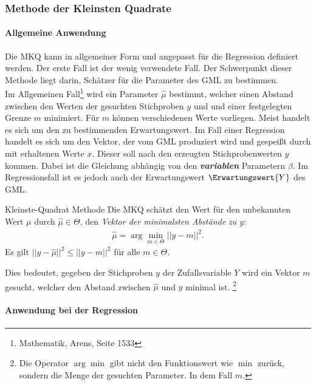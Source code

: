 \subsubsection{Methode der Kleinsten Quadrate}
\paragraph{Allgemeine Anwendung}
Die \gls{MKQ} kann in allgemeiner Form und angepasst für die Regression definiert werden. Der erste Fall ist der wenig verwendete Fall. Der Schwerpunkt dieser Methode liegt darin, Schätzer für die Parameter des \gls{GML} zu bestimmen.\\

Im Allgemeinen Fall\footnote{Mathematik, Arens, Seite 1533} wird ein Parameter $\hat{\mu}$ bestimmt, welcher einen Abstand zwischen den Werten der gesuchten Stichproben $y$ und und einer festgelegten Grenze $m$ minimiert. Für $m$ können verschiedenen Werte vorliegen. Meist handelt es sich um den zu bestimmenden Erwartungswert. Im Fall einer Regression handelt es sich um den Vektor, der vom \gls{GML} produziert wird und gespeißt durch mit erhaltenen Werte $x$. Dieser soll nach den erzeugten Stichprobenwerten $y$ kommen. Dabei ist die Gleichung abhängig von den \textit{\textbf{variablen}} Parametern $\beta$. Im Regressionsfall ist es jedoch auch der Erwartungswert $\Erwartungswert{Y}$ des \gls{GML}.

\begin{Definition}{Kleinste-Quadrat Methode}
	Die \gls{MKQ} schätzt den Wert für den unbekannten Wert $\mu$ durch $\hat{\mu}\in\Theta$, den \textit{Vektor der minimalsten Abstände zu} $y$:
	\begin{align}
		\hat{\mu} = \arg\min_{m\in\Theta} ||y - m||^2.
	\end{align}
	Es gilt $||y - \hat{\mu}||^2 \leq ||y - m||^2$ für alle $m\in \Theta$.
\end{Definition}
Dies bedeutet, gegeben der Stichproben $y$ der Zufallsvariable $Y$ wird ein Vektor $m$ gesucht, welcher den Abstand zwischen $\hat{\mu}$ und $y$ minimal ist. \footnote{Die Operator $\arg\min$ gibt nicht den Funktionswert wie $\min$ zurück, sondern die Menge der gesuchten Parameter. In dem Fall $m$.}\\ 

\paragraph{Anwendung bei der Regression}

